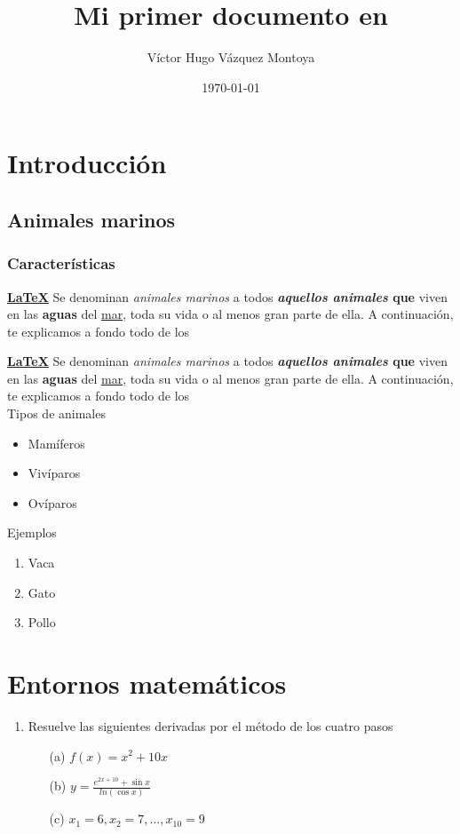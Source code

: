 \documentclass{article}
\title{Mi primer  documento en \LaTeXe}
\author{Víctor Hugo Vázquez Montoya}
\date{\small{\today}}
\begin{document}
\maketitle

\section{Introducción}
\subsection{Animales marinos}
\subsubsection{Características}
{\Huge \textbf{\underline{\LaTeX}}}
Se denominan \emph{animales marinos} a todos \textbf{\textit{aquellos animales} que} viven en las \textbf{aguas} del \underline{mar}, toda su vida o al menos gran parte de ella. A continuación, te explicamos a fondo todo de los

\newpage

{\Huge \textbf{\underline{\LaTeX}}}
Se denominan \emph{animales marinos} a todos \textbf{\textit{aquellos animales} que} viven en las \textbf{aguas} del \underline{mar}, toda su vida o al menos gran parte de ella. A continuación, te explicamos a fondo todo de los\\
{\Large Tipos de animales}
 \begin{itemize}
     \item Mamíferos
     \item Vivíparos
     \item Ovíparos
 \end{itemize}
 {\footnotesize Ejemplos}
 \begin{enumerate}
     \item Vaca
     \item Gato
    \item Pollo
 \end{enumerate}
 \section{Entornos matemáticos}
 \begin{enumerate}
     \item Resuelve las siguientes derivadas por el método de los cuatro pasos
     \begin{itemize}
         \item [(a)]$f(x)=x^2+10x$
         \item [(b)] $y=\frac{e^{2x+10}+\sin x}{ln(\cos x)}$
         \item [(c)] $x_{1}=6,x_{2}=7,\ldots, x_{10}=9$
     \end{itemize}
 \end{enumerate}
\end{document}
